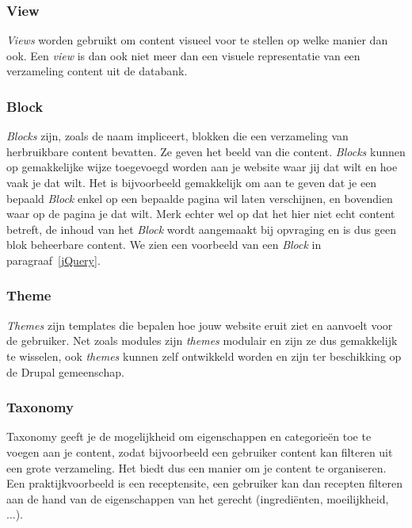 \subsubsection{View}
\textit{Views} worden gebruikt om content visueel voor te stellen op welke manier dan ook. Een \textit{view} is dan ook niet meer dan een visuele representatie van een verzameling content uit de databank.

\subsubsection{Block}
\textit{Blocks} zijn, zoals de naam impliceert, blokken die een verzameling van herbruikbare content bevatten. Ze geven het beeld van die content. \textit{Blocks} kunnen op gemakkelijke wijze toegevoegd worden aan je website waar jij dat wilt en hoe vaak je dat wilt. Het is bijvoorbeeld gemakkelijk om aan te geven dat je een bepaald \textit{Block} enkel op een bepaalde pagina wil laten verschijnen, en bovendien waar op de pagina je dat wilt. Merk echter wel op dat het hier niet echt content betreft, de inhoud van het \textit{Block} wordt aangemaakt bij opvraging en is dus geen blok beheerbare content. We zien een voorbeeld van een \textit{Block} in paragraaf~\ref{jQuery}.

\subsubsection{Theme}
\textit{Themes} zijn templates die bepalen hoe jouw website eruit ziet en aanvoelt voor de gebruiker. Net zoals modules zijn \textit{themes} modulair en zijn ze dus gemakkelijk te wisselen, ook \textit{themes} kunnen zelf ontwikkeld worden en zijn ter beschikking op de Drupal gemeenschap.

\subsubsection{Taxonomy}
Taxonomy geeft je de mogelijkheid om eigenschappen en categorie\"{e}n toe te voegen aan je content, zodat bijvoorbeeld een gebruiker content kan filteren uit een grote verzameling. Het biedt dus een manier om je content te organiseren. Een praktijkvoorbeeld is een receptensite, een gebruiker kan dan recepten filteren aan de hand van de eigenschappen van het gerecht (ingredi\"{e}nten, moeilijkheid, ...).

